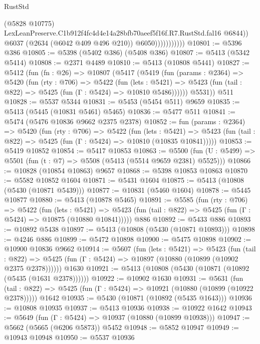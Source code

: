 \begin{lexlean}{RustStd}
\begin{coremodule}
                              (@5828 @10775)
                              LexLeanPreserve.C1b912f4fc4d4e14a28bfb70aeef5f16f.R7.RustStd.fal16
                              @6844))
                          @6037
                          (@2634 (@6042 @409 @496 @210))
                          @6050)))))))))))
@10801 := @5396 @386
@10805 := @5398 (@5402 @386) (@5408 @386)
@10807 := @5413 (@5342 @5414)
@10808 := @2371 @4489
@10810 := @5413 (@10808 @5441)
@10827 := @5412
    (fun (fn : @26) =>
    @10807
      (@5417
        (@5419
          (fun (params : @2364) =>
          @5420
            (fun (rty : @706) =>
            @5422
              (fun (lets : @5421) =>
              @5423 (fun (tail : @822) => @5425 (fun (Γ : @5424) => @10810 @5486))))))
        @5531))
    @511
@10828 := @5537 @5344
@10831 := @5453 (@5454 @511) @9659
@10835 := @5413 (@5445 (@10831 @5461) @5465)
@10836 := @5477 @511
@10841 := @5474 (@5476 @10836 @9662 @2375 @2378)
@10852 := fun (params : @2364) =>
  @5420
    (fun (rty : @706) =>
    @5422
      (fun (lets : @5421) =>
      @5423 (fun (tail : @822) => @5425 (fun (Γ : @5424) => @10810 (@10835 @10841)))))
@10853 := @5419 @10852
@10854 := @5417 @10853
@10863 := @5500 (fun (U : @5499) => @5501 (fun (t : @7) => @5508 (@5413 (@5514 @9659 @2381) @5525)))
@10866 := @10828 (@10854 @10863) @9657
@10868 := @5398 @10853 @10863
@10870 := @5582 @10852 @1604
@10871 := @5431 @1604
@10875 := @5413 (@10808 (@5430 (@10871 @5439)))
@10877 := @10831 (@5460 @1604)
@10878 := @5445 @10877
@10880 := @5413 (@10878 @5465)
@10891 := @5585
    (fun (rty : @706) =>
    @5422
      (fun (lets : @5421) =>
      @5423 (fun (tail : @822) => @5425 (fun (Γ : @5424) => @10875 (@10880 @10841)))))
    @886
@10892 := @5433 @886
@10893 := @10892 @5438
@10897 := @5413 (@10808 (@5430 (@10871 @10893)))
@10898 := @4246 @886
@10899 := @5472 @10898
@10900 := @5475 @10898
@10902 := @10900 @10836 @9662
@10914 := @5607
    (fun (lets : @5421) =>
    @5423
      (fun (tail : @822) =>
      @5425 (fun (Γ : @5424) => @10897 (@10880 (@10899 (@10902 @2375 @2378))))))
    @1630
@10921 := @5413 (@10808 (@5430 (@10871 (@10892 (@5435 (@1631 @2378))))))
@10922 := @10902 @1630
@10931 := @5631
    (fun (tail : @822) => @5425 (fun (Γ : @5424) => @10921 (@10880 (@10899 (@10922 @2378)))))
    @1642
@10935 := @5430 (@10871 (@10892 (@5435 @1643)))
@10936 := @10808 @10935
@10937 := @5413 @10936
@10938 := @10922 @1642
@10943 := @5649 (fun (Γ : @5424) => @10937 (@10880 (@10899 @10938)))
@10947 := @5662 (@5665 (@6206 @5873)) @5452
@10948 := @5852 @10947
@10949 := @10943 @10948
@10950 := @5537 @10936

\end{coremodule}
\end{lexlean}
